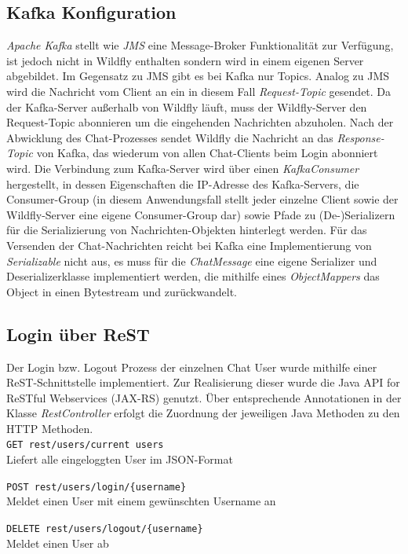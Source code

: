 \documentclass[10pt,journal,compsoc]{IEEEtran}
\begin{document}
\subsection{Kafka Konfiguration}
\textit{Apache Kafka} stellt wie \textit{JMS} eine Message-Broker Funktionalität zur Verfügung, ist jedoch nicht in Wildfly enthalten sondern wird in einem eigenen Server abgebildet. Im Gegensatz zu JMS gibt es bei Kafka nur Topics. 
Analog zu JMS wird die Nachricht vom Client an ein in diesem Fall \textit{Request-Topic} gesendet. Da der Kafka-Server außerhalb von Wildfly läuft, muss der Wildfly-Server den Request-Topic abonnieren um die eingehenden Nachrichten abzuholen. Nach der Abwicklung des Chat-Prozesses sendet Wildfly die Nachricht an das \textit{Response-Topic} von Kafka, das wiederum von allen Chat-Clients beim Login abonniert wird.
Die Verbindung zum Kafka-Server wird über einen \textit{KafkaConsumer} hergestellt, in dessen Eigenschaften die IP-Adresse des Kafka-Servers, die Consumer-Group (in diesem Anwendungsfall stellt jeder einzelne Client sowie der Wildfly-Server eine eigene Consumer-Group dar) sowie Pfade zu (De-)Serializern für die Serializierung von Nachrichten-Objekten hinterlegt werden. Für das Versenden der Chat-Nachrichten reicht bei Kafka eine Implementierung von \textit{Serializable} nicht aus, es muss für die \textit{ChatMessage} eine eigene Serializer und Deserializerklasse implementiert werden, die mithilfe eines \textit{ObjectMappers} das Object in einen Bytestream und zurückwandelt.


\subsection{Login über ReST}
\label{login}
Der Login bzw. Logout Prozess der einzelnen Chat User wurde mithilfe einer ReST-Schnittstelle implementiert. Zur Realisierung dieser wurde die Java API for ReSTful Webservices (JAX-RS) genutzt. 
Über entsprechende Annotationen in der Klasse \textit{RestController} erfolgt die Zuordnung der jeweiligen Java Methoden zu den HTTP Methoden. 
\\

\lstinline|GET rest/users/current users|
\\
Liefert alle eingeloggten User im JSON-Format

\lstinline|POST rest/users/login/{username}|
\\Meldet einen User mit einem gewünschten Username an

\lstinline|DELETE rest/users/logout/{username}| 
\\Meldet einen User ab 
\\
\end{document}
